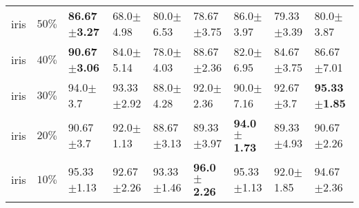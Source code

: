 \begin{tabular}{lllllllll}
       iris &     $ 50\% $ & \textbf{86.67$\pm$3.27} &           68.0$\pm$4.98 &  80.0$\pm$6.53 &          78.67$\pm$3.75 &          86.0$\pm$3.97 &          79.33$\pm$3.39 &           80.0$\pm$3.87 \\
       iris &     $ 40\% $ & \textbf{90.67$\pm$3.06} &           84.0$\pm$5.14 &  78.0$\pm$4.03 &          88.67$\pm$2.36 &          82.0$\pm$6.95 &          84.67$\pm$3.75 &          86.67$\pm$7.01 \\
       iris &     $ 30\% $ &            94.0$\pm$3.7 &          93.33$\pm$2.92 &  88.0$\pm$4.28 &           92.0$\pm$2.36 &          90.0$\pm$7.16 &           92.67$\pm$3.7 & \textbf{95.33$\pm$1.85} \\
       iris &     $ 20\% $ &           90.67$\pm$3.7 &           92.0$\pm$1.13 & 88.67$\pm$3.13 &          89.33$\pm$3.97 & \textbf{94.0$\pm$1.73} &          89.33$\pm$4.93 &          90.67$\pm$2.26 \\
       iris &     $ 10\% $ &          95.33$\pm$1.13 &          92.67$\pm$2.26 & 93.33$\pm$1.46 &  \textbf{96.0$\pm$2.26} &         95.33$\pm$1.13 &           92.0$\pm$1.85 &          94.67$\pm$2.36 \\
\bottomrule
\end{tabular}
